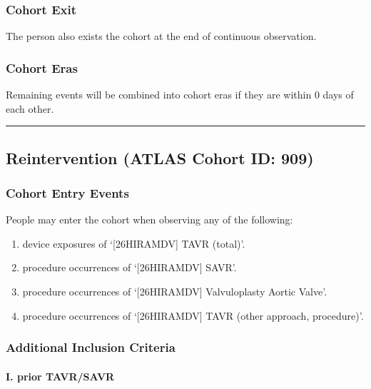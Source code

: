 \documentclass[
  12pt,
]{article}
\begin{document}
\subsubsection{Cohort Exit}\label{cohort-exit-8}

The person also exists the cohort at the end of continuous observation.

\subsubsection{Cohort Eras}\label{cohort-eras-8}

Remaining events will be combined into cohort eras if they are within 0
days of each other.

\begin{center}\rule{0.5\linewidth}{0.5pt}\end{center}

\subsection{Reintervention (ATLAS Cohort ID:
909)}\label{reintervention-atlas-cohort-id-909}

\subsubsection{Cohort Entry Events}\label{cohort-entry-events-9}

People may enter the cohort when observing any of the following:

\begin{enumerate}
\def\labelenumi{\arabic{enumi}.}
\item
  device exposures of `{[}26HIRAMDV{]} TAVR (total)'.
\item
  procedure occurrences of `{[}26HIRAMDV{]} SAVR'.
\item
  procedure occurrences of `{[}26HIRAMDV{]} Valvuloplasty Aortic Valve'.
\item
  procedure occurrences of `{[}26HIRAMDV{]} TAVR (other approach,
  procedure)'.
\end{enumerate}

\subsubsection{Additional Inclusion
Criteria}\label{additional-inclusion-criteria-8}

\paragraph*{I. prior TAVR/SAVR}\label{i.-prior-tavrsavr}
\end{document}
